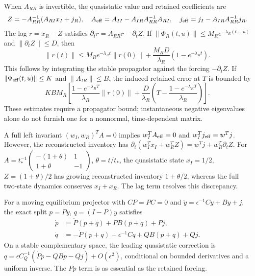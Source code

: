 When $A_{RR}$ is invertible, the quasistatic value and retained coefficients are
\begin{equation}
 Z=-A_{RR}^{-1}(A_{RI}x_I+j_R),\quad
 A_{\rm eff}=A_{II}-A_{IR}A_{RR}^{-1}A_{RI},\quad
 j_{\rm eff}=j_I-A_{IR}A_{RR}^{-1}j_R .
 \label{v:schur}
\end{equation}
The lag $r=x_R-Z$ satisfies $\partial_tr=A_{RR}r-\partial_tZ$.
If $\|\Phi_R(t,u)\|\le M_Re^{-\lambda_R(t-u)}$ and $\|\partial_tZ\|\le D$, then
\begin{equation}
 \|r(t)\|\le M_Re^{-\lambda_Rt}\|r(0)\|
 +\frac{M_RD}{\lambda_R}(1-e^{-\lambda_Rt}).
 \label{v:lag_bound}
\end{equation}
This follows by integrating the stable propagator against the forcing $-\partial_tZ$. If $\|\Phi_{\rm eff}(t,u)\|\le K$ and $\|A_{IR}\|\le B$, the induced retained error at $T$ is bounded by
\begin{equation}
 KBM_R\left[
 \frac{1-e^{-\lambda_RT}}{\lambda_R}\|r(0)\|
 +\frac{D}{\lambda_R}
 \left(T-\frac{1-e^{-\lambda_RT}}{\lambda_R}\right)\right].
 \label{v:retained_lag}
\end{equation}
These estimates require a propagator bound; instantaneous negative eigenvalues alone do not furnish one for a nonnormal, time-dependent matrix.

A full left invariant $(w_I,w_R)^TA=0$ implies $w_I^TA_{\rm eff}=0$ and
$w_I^Tj_{\rm eff}=w^Tj$. However, the reconstructed inventory has
$\partial_t(w_I^Tx_I+w_R^TZ)=w^Tj+w_R^T\partial_tZ$.
For $A=t_*^{-1}\left(\begin{smallmatrix}-(1+\theta)&1\\1+\theta&-1\end{smallmatrix}\right)$, $\theta=t/t_*$,
the quasistatic state $x_I=1/2$, $Z=(1+\theta)/2$ has growing reconstructed inventory $1+\theta/2$, whereas the full two-state dynamics conserves $x_I+x_R$. The lag term resolves this discrepancy.

For a moving equilibrium projector with $CP=PC=0$ and
$\dot y=\epsilon^{-1}Cy+By+j$, the exact split $p=Py$, $q=(I-P)y$ satisfies
\begin{align}
 \dot p&=\dot P(p+q)+PB(p+q)+Pj,\nonumber\\
 \dot q&=-\dot P(p+q)+\epsilon^{-1}Cq+QB(p+q)+Qj.
 \label{v:moving_elimination}
\end{align}
On a stable complementary space, the leading quasistatic correction is
$q=\epsilon C_Q^{-1}(\dot Pp-QBp-Qj)+O(\epsilon^2)$, conditional on bounded derivatives and a uniform inverse. The $\dot Pp$ term is as essential as the retained forcing.

